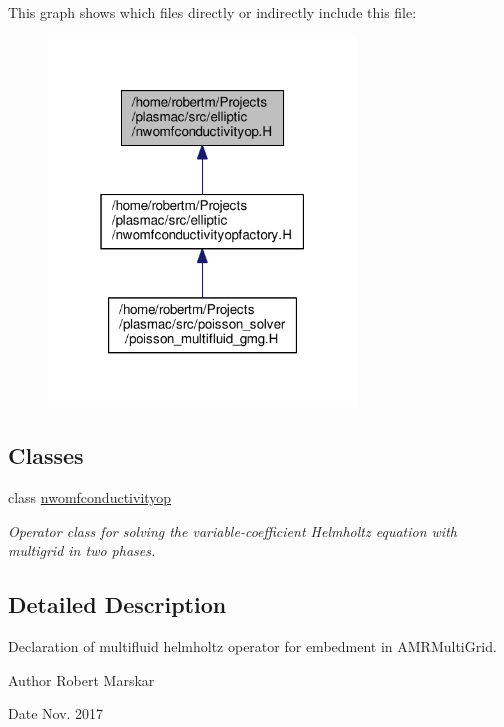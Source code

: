 This graph shows which files directly or indirectly include this file\+:\nopagebreak
\begin{figure}[H]
\begin{center}
\leavevmode
\includegraphics[width=232pt]{nwomfconductivityop_8H__dep__incl}
\end{center}
\end{figure}
\subsection*{Classes}
\begin{DoxyCompactItemize}
\item 
class \hyperlink{classnwomfconductivityop}{nwomfconductivityop}
\begin{DoxyCompactList}\small\item\em Operator class for solving the variable-\/coefficient Helmholtz equation with multigrid in two phases. \end{DoxyCompactList}\end{DoxyCompactItemize}


\subsection{Detailed Description}
Declaration of multifluid helmholtz operator for embedment in A\+M\+R\+Multi\+Grid. 

\begin{DoxyAuthor}{Author}
Robert Marskar 
\end{DoxyAuthor}
\begin{DoxyDate}{Date}
Nov. 2017 
\end{DoxyDate}
